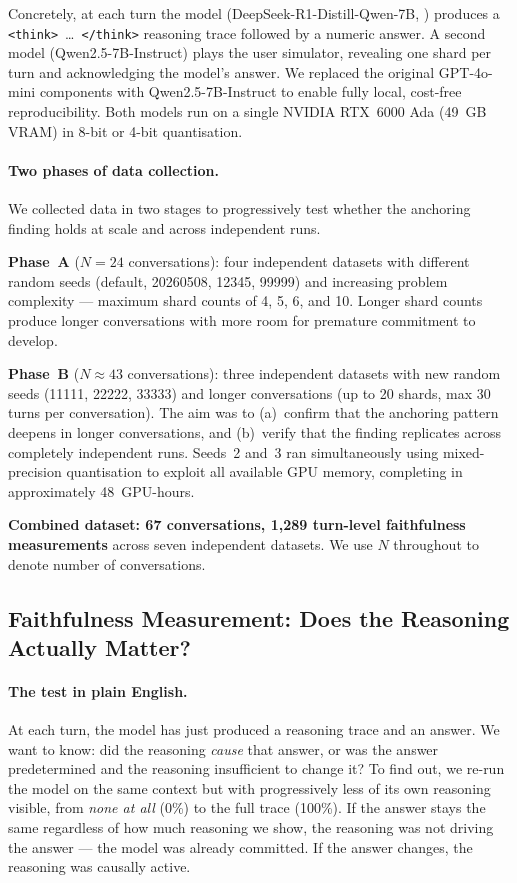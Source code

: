 \documentclass{article}
\begin{document}
Concretely, at each turn the model (DeepSeek-R1-Distill-Qwen-7B,
\citealt{deepseekr1_2025}) produces a \texttt{<think>}~\ldots~\texttt{</think>}
reasoning trace followed by a numeric answer.
A second model (Qwen2.5-7B-Instruct) plays the user simulator,
revealing one shard per turn and acknowledging the model's answer.
We replaced the original GPT-4o-mini components with
Qwen2.5-7B-Instruct to enable fully local, cost-free reproducibility.
Both models run on a single NVIDIA RTX~6000 Ada (49~GB VRAM)
in 8-bit or 4-bit quantisation.

\paragraph{Two phases of data collection.}
We collected data in two stages to progressively test whether the
anchoring finding holds at scale and across independent runs.

\textbf{Phase~A} ($N = 24$ conversations): four independent
datasets with different random seeds (default, 20260508, 12345,
99999) and increasing problem complexity --- maximum shard counts
of 4, 5, 6, and 10.
Longer shard counts produce longer conversations with more room
for premature commitment to develop.

\textbf{Phase~B} ($N \approx 43$ conversations): three independent
datasets with new random seeds (11111, 22222, 33333) and longer
conversations (up to 20 shards, max 30 turns per conversation).
The aim was to (a)~confirm that the anchoring pattern deepens
in longer conversations, and (b)~verify that the finding
replicates across completely independent runs.
Seeds~2 and~3 ran simultaneously using mixed-precision quantisation
to exploit all available GPU memory, completing in approximately
48~GPU-hours.

\textbf{Combined dataset: 67 conversations, 1,289 turn-level
faithfulness measurements} across seven independent datasets.
We use $N$ throughout to denote number of conversations.

\subsection{Faithfulness Measurement: Does the Reasoning Actually Matter?}

\paragraph{The test in plain English.}
At each turn, the model has just produced a reasoning trace and
an answer.
We want to know: did the reasoning \emph{cause} that answer,
or was the answer predetermined and the reasoning insufficient
to change it?
To find out, we re-run the model on the same context but with
progressively less of its own reasoning visible, from \emph{none
at all} (0\%) to the full trace (100\%).
If the answer stays the same regardless of how much reasoning
we show, the reasoning was not driving the answer --- the model
was already committed.
If the answer changes, the reasoning was causally active.
\end{document}
